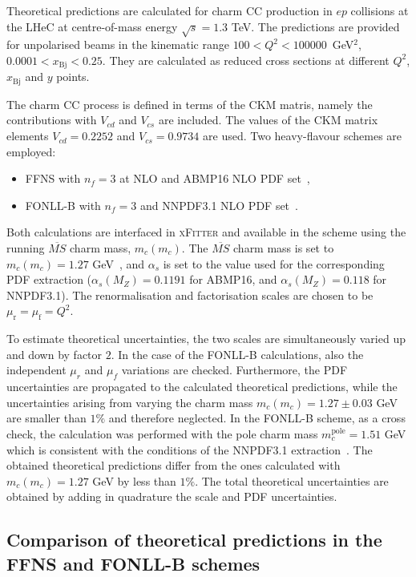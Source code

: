 \documentclass[pdftex,twocolumn,epjc3]{svjour3}          %
\newcommand{\abmp} {ABMP16\xspace}
\newcommand{\nnpdf} {NNPDF3.1\xspace}
\newcommand{\xfitter} {\textsc{xFitter}\xspace}
\newcommand{\xbj}{\ensuremath{x_{\text{Bj}}}\xspace}
\newcommand{\fonll} {{FONLL-B}\xspace}
\newcommand{\ffns} {{FFNS}\xspace}
\begin{document}
Theoretical predictions are calculated for charm CC production in $ep$ collisions at the LHeC at centre-of-mass energy $\sqrt{s} = 1.3$ TeV. The predictions are provided for unpolarised beams in the kinematic range $100 < Q^2 < 100000$~GeV$^2$, $0.0001 < \xbj < 0.25$. They are calculated as reduced cross sections at different $Q^2$, \xbj and $y$ points.

The charm CC process is defined in terms of the CKM matris, namely the contributions with $V_{cd}$ and $V_{cs}$ are included. 
The values of the CKM matrix elements $V_{cd} = 0.2252$ and $V_{cs} = 0.9734$ are used.
Two heavy-flavour schemes are employed:
\begin{itemize}
  \item FFNS with $n_f = 3$ at NLO and \abmp NLO PDF set~\cite{Alekhin:2018pai},
  \item FONLL-B with $n_f = 3$ and \nnpdf NLO PDF set~\cite{Ball:2017nwa}.
\end{itemize}
Both calculations are interfaced in \xfitter and available in the scheme using the running $\overline{MS}$ charm mass, $m_c(m_c)$.
The $\overline{MS}$ charm mass is set to $m_c(m_c) = 1.27$ GeV~\cite{pdg}, and $\alpha_s$ is set to the value used for the corresponding PDF extraction ($\alpha_s(M_Z) = 0.1191$ for \abmp, and $\alpha_s(M_Z) = 0.118$ for \nnpdf).
The renormalisation and factorisation scales are chosen to be $\mu_\mathrm{r} = \mu_\mathrm{f} = Q^2$.

To estimate theoretical uncertainties, the two scales are simultaneously varied up and down by factor $2$. In the case of the \fonll calculations, also the independent $\mu_r$ and $\mu_f$ variations are checked. Furthermore, the PDF uncertainties are propagated to the calculated theoretical predictions, while the uncertainties arising from varying the charm mass $m_c(m_c) = 1.27 \pm 0.03$ GeV are smaller than $1\%$ and therefore neglected. In the \fonll scheme, as a cross check, the calculation was performed with the pole charm mass $m_c^{\text{pole}} = 1.51$ GeV which is consistent with the conditions of the \nnpdf extraction~\cite{Ball:2017nwa}. The obtained theoretical predictions differ from the ones calculated with $m_c(m_c) = 1.27$ GeV by less than $1\%$.
The total theoretical uncertainties are obtained by adding in quadrature the scale and PDF uncertainties.

\subsection{Comparison of theoretical predictions in the \ffns and \fonll schemes}
\label{sec:thpred-comparison}
\end{document}
